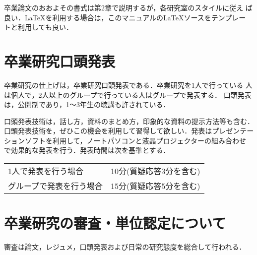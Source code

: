 卒業論文のおおよその書式は第2章で説明するが，各研究室のスタイルに従え
ば良い．\LaTeX を利用する場合は，このマニュアルの\LaTeX ソースをテンプレー
トと利用しても良い．

\section{卒業研究口頭発表}
\label{sec:presentation}

卒業研究の仕上げは，卒業研究口頭発表である．卒業研究を1人で行っている
人は個人で，2人以上のグループで行っている人はグループで発表する．
口頭発表は，公開制であり，1〜3年生の聴講も許されている．

口頭発表技術は，話し方，資料のまとめ方，印象的な資料の提示方法等も含む．
口頭発表技術を，ぜひこの機会を利用して習得して欲しい．発表はプレゼンテー
ションソフトを利用して，ノートパソコンと液晶プロジェクターの組み合わせ
で効果的な発表を行う．発表時間は次を基準とする．\\

\begin{tabular}[h]{ll}
  1人で発表を行う場合 & 10分(質疑応答3分を含む)\\
  グループで発表を行う場合 & 15分(質疑応答5分を含む)\\
\end{tabular}

\section{卒業研究の審査・単位認定について}
\label{sec:referee}
審査は論文，レジュメ，口頭発表および日常の研究態度を総合して行われる．

